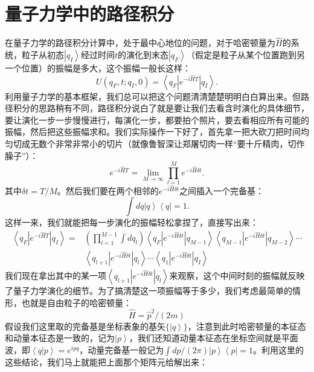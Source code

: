 \documentclass[12pt, a4paper, oneside]{ctexart}
\begin{document}
\section{量子力学中的路径积分}
在量子力学的路径积分计算中，处于最中心地位的问题，对于哈密顿量为$\hat H$的系统，粒子从初态$\left|  q_I \right>$经过时间$t$的演化到末态$\left|  q_F \right>$（假定是粒子从某个位置跑到另一个位置）的振幅是多大，这个振幅一般长这样：
\begin{equation}
    U(q_F,t;q_I,0)=\left< q_F | e^{-i\hat HT} | q_I \right>.
\end{equation}
利用量子力学的基本框架，我们总可以把这个问题清清楚楚明明白白算出来。但路径积分的思路稍有不同，路径积分说白了就是要让我们去看含时演化的具体细节，要让演化一步一步慢慢进行，每演化一步，都要拍个照片，要去看相应所有可能的振幅，然后把这些振幅求和。我们实际操作一下好了，首先拿一把大砍刀把时间均匀切成无数个非常非常小的切片（就像鲁智深让郑屠切肉一样“要十斤精肉，切作臊子”）：
\begin{equation}
    e^{-i\hat HT}=\lim_{M\rightarrow\infty}\prod_{l=1}^Me^{-i\hat H\delta t}.
\end{equation}
其中$\delta t=T/M$。然后我们要在两个相邻的$e^{-i\hat H\delta t}$之间插入一个完备基：
\begin{equation}
    \int dq\left| q \right> \left< q \right|=1.
\end{equation}
这样一来，我们就能把每一步演化的振幅轻松拿捏了，直接写出来：
\begin{align} 
\left< q_F | e^{-i\hat HT} | q_I \right>=&(\prod_{l=1}^{M-1}\int dq_l) \left< q_F | e^{-i\hat H\delta t} | q_{M-1} \right>\left< q_{M-1} | e^{-i\hat H\delta t} | q_{M-2} \right>\cdots\nonumber\\ 
&\left< q_{l+1}| e^{-i\hat H\delta t} | q_{l} \right>\cdots \left< q_{1}| e^{-i\hat H\delta t} | q_{I} \right> 
\end{align}
我们现在拿出其中的某一项$\left< q_{l+1}| e^{-i\hat H\delta t} | q_{l} \right>$来观察，这个中间时刻的振幅就反映了量子力学演化的细节。为了搞清楚这一项振幅等于多少，我们考虑最简单的情形，也就是自由粒子的哈密顿量：
\begin{equation}
    \hat H=\hat p^2/(2m)
\end{equation}
假设我们这里取的完备基是坐标表象的基矢$\{ \left| q \right> \}$，注意到此时哈密顿量的本征态和动量本征态是一致的，记为$\left| p \right>$，我们还知道动量本征态在坐标空间就是平面波，即$\left< q | p \right>=e^{ipq}$，动量完备基一般记为$\int dp/(2\pi)\left| p \right>\left< p \right|=1$。利用这里的这些结论，我们马上就能把上面那个矩阵元给解出来：
\end{document}
